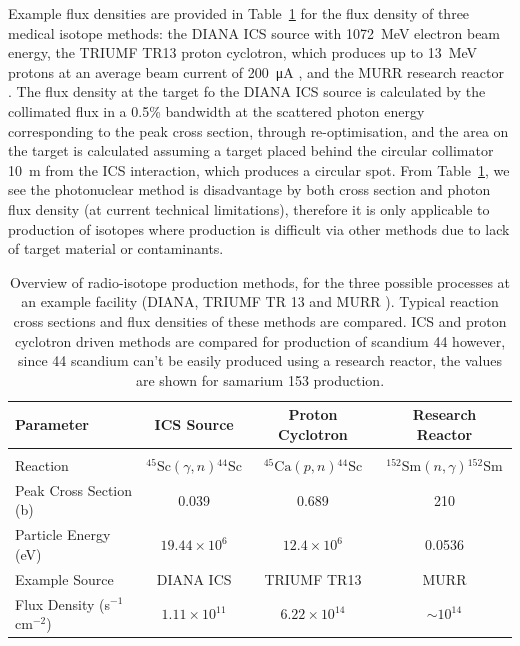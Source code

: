 \documentclass[../main.tex]{subfiles}
\begin{document}
Example flux densities are provided in Table~\ref{tab:example_isotope_cross_section_flux_density} for the flux density of three medical isotope methods: the DIANA ICS source with 1072~\si{\mega\electronvolt} electron beam energy, the TRIUMF TR13 proton cyclotron, which produces up to 13~\si{\mega\electronvolt} protons at an average beam current of 200~\si{\micro\ampere} \cite{hoehr2017medical,laxdale1994beam}, and the MURR research reactor \cite{ma1996production}. The flux density at the target fo the DIANA ICS source is calculated by the collimated flux in a 0.5\% bandwidth at the scattered photon energy corresponding to the peak cross section, through re-optimisation, and the area on the target is calculated assuming a target placed behind the circular collimator 10~\si{\meter} from the ICS interaction, which produces a circular spot. From Table~\ref{tab:example_isotope_cross_section_flux_density}, we see the photonuclear method is disadvantage by both cross section and photon flux density (at current technical limitations), therefore it is only applicable to production of isotopes where production is difficult via other methods due to lack of target material or contaminants.
\begin{table}[!h]
\centering
\caption{Overview of radio-isotope production methods, for the three possible processes at an example facility (DIANA, TRIUMF TR 13 and MURR ). Typical reaction cross sections and flux densities of these methods are compared. ICS and proton cyclotron driven methods are compared for production of scandium 44 however, since 44 scandium can't be easily produced using a research reactor, the values are shown for samarium 153 production.}
\vspace{3mm}
\begin{tabular}{lccc}
\hline\hline
Parameter & ICS Source & Proton Cyclotron & Research Reactor \\
\hline
\multicolumn{4}{c}{\vspace{-4mm}}\\
Reaction & $^{45}\mathrm{Sc}\left(\gamma,n\right){}^{44}\mathrm{Sc}$ & $^{45}\mathrm{Ca}\left(p,n\right){}^{44}\mathrm{Sc}$ & $^{152}\mathrm{Sm}\left(n,\gamma\right){}^{152}\mathrm{Sm}$ \\
Peak Cross Section (\si{\barn}) & 0.039 \cite{veyssiere1974study} & 0.689 \cite{carzaniga2017measurement} &  210 \cite{ma1996production} \\
Particle Energy (\si{\electronvolt}) & $19.44\times 10^{6}$ & $12.4\times 10^{6}$ & 0.0536 \\
Example Source & DIANA ICS & TRIUMF TR13 \cite{hoehr2017medical,laxdale1994beam} & MURR \cite{ma1996production} \\
Flux Density (\si{\second}$^{-1}$\si{\centi\meter}$^{-2}$) & $1.11\times 10^{11}$ & $6.22\times 10^{14}$ & $\sim 10^{14}$ \\
\hline\hline
\end{tabular}
\label{tab:example_isotope_cross_section_flux_density}
\end{table}
\end{document}
